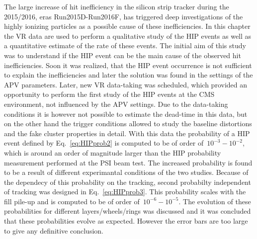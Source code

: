 The large increase of hit inefficiency in the silicon strip tracker during the 2015/2016, eras Run2015D-Run2016F, has triggered deep investigations of the highly ionizing particles as a possible cause of these inefficiencies. In this chapter the VR data are used to perform a qualitative study of the HIP events as well as a quantitative estimate of the rate of these events. The initial aim of this study was to understand if the HIP event can be the main cause of the observed hit inefficiencies. Soon it was realized, that the HIP event occurrence is not sufficient to explain the inefficiencies and later the solution was found in the settings of the APV parameters. Later, new VR data-taking was scheduled, which provided an opportunity to perform the first study of the HIP events at the CMS environment, not influenced by the APV settings. Due to the data-taking conditions it is however not possible to estimate the dead-time in this data, but on the other hand the trigger conditions allowed to study the baseline distortions and the fake cluster properties in detail. With this data the probability of a HIP event defined by Eq.~\ref{eq:HIPprob2} is computed to be of order of~$10^{-3}-10^{-2}$, which is around an order of magnitude larger than the HIP probability measurement performed at the PSI beam test. The increased probability is found to be a result of different experimantal conditions of the two studies. Because of the dependecy of this probability on the tracking, second probabilty independent of tracking was designed in Eq.~\ref{eq:HIPprob3}. This probability scales with the fill pile-up and is computed to be of order of~$10^{-6}-10^{-5}$. The evolution of these probabilities for different layers/wheels/rings was discussed and it was concluded that these probabilities evolve as expected. However the error bars are too large to give any definitive conclusion.

\newpage

